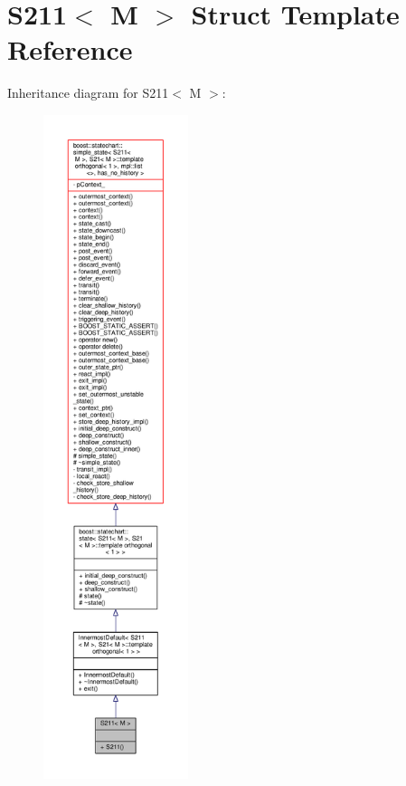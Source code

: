 \hypertarget{struct_s211}{}\section{S211$<$ M $>$ Struct Template Reference}
\label{struct_s211}


Inheritance diagram for S211$<$ M $>$\+:
\nopagebreak
\begin{figure}[H]
\begin{center}
\leavevmode
\includegraphics[height=550pt]{struct_s211__inherit__graph}
\end{center}
\end{figure}


